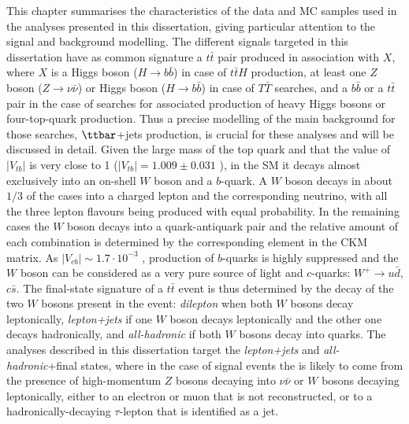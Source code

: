 
This chapter summarises the characteristics of the data and MC samples used in the analyses presented in this dissertation, giving particular attention to the signal and background modelling. The different signals targeted in this dissertation have as common signature a $t\bar{t}$ pair produced in association with $X$, where $X$ is a Higgs boson ($H\to b\bar{b}$) in case of $t\bar{t}H$ production, at least one $Z$ boson ($Z\to \nu \bar{\nu}$) or Higgs boson ($H\to b\bar{b}$) in case of $T\bar{T}$  searches, and a $b\bar{b}$ or a $t\bar{t}$ pair in the case of searches for associated production of heavy Higgs bosons or four-top-quark production. Thus a precise modelling of the main background for those searches, $\ttbar$+jets production, is crucial for these analyses and will be discussed in detail. Given the large mass of the top quark and that the value of $|V_{tb}|$ is very close to 1 ($|V_{tb}| = 1.009\pm0.031$ \cite{Olive:2016xmw}), in the SM it decays almost exclusively into an on-shell $W$ boson and a $b$-quark. A $W$ boson decays in about $1/3$ of the cases into a charged lepton and the corresponding neutrino, with all the three lepton flavours being produced with equal probability. In the remaining cases the $W$ boson decays into a quark-antiquark pair and the relative amount of each combination is determined by the corresponding element in the CKM matrix. As $|V_{cb}|\sim 1.7 \cdot 10^{-3}$ \cite{Olive:2016xmw}, production of $b$-quarks is highly suppressed and the $W$ boson can be considered as a very pure source of light and $c$-quarks: $W^+ \to u\bar{d}$, $c\bar{s}$. The final-state signature of a $t\bar{t}$ event is thus determined by the decay of the two $W$ bosons present in the event: \emph{dilepton} when both $W$ bosons decay leptonically, \emph{lepton+jets} if one $W$ boson decays leptonically and the other one decays hadronically, and \emph{all-hadronic} if both $W$ bosons decay into quarks. The analyses described in this dissertation target the \emph{lepton+jets} and \emph{all-hadronic}+\MET final states, where in the case of signal events the \MET is likely to come from  the presence of high-momentum $Z$ bosons decaying into $\nu \bar{\nu}$ or $W$ bosons decaying leptonically, either to an electron or muon that is not reconstructed, or to a hadronically-decaying $\tau$-lepton that is identified as a jet.
